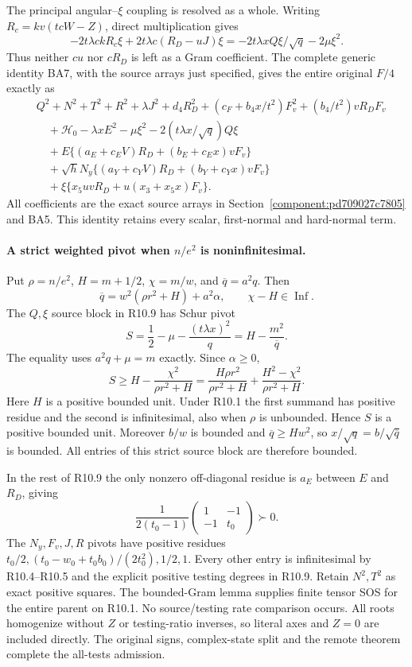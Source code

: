 The principal angular--$\xi$ coupling is resolved as a whole.
Writing $R_c=kv(tcW-Z)$, direct multiplication gives
\[
 -2t\lambda ck R_c\xi+2t\lambda c(R_D-uJ)\xi
 =-2t\lambda x Q\xi/\sqrt q-2\mu\xi^2.
\tag{R10.8}
\]
Thus neither $cu$ nor $cR_D$ is left as a Gram coefficient. The
complete generic identity BA7, with the source arrays just specified,
gives the entire original $F/4$ exactly as
\[
\begin{split}
 &Q^2+N^2+T^2+R^2+\lambda J^2+d_4R_D^2
 +(c_F+b_4x/t^2)F_v^2+(b_4/t^2)vR_DF_v\\
 &\quad+\mathcal H_0-\lambda xE^2-\mu\xi^2
                  -2(t\lambda x/\sqrt q)Q\xi\\
 &\quad+E\{(a_E+c_EV)R_D+(b_E+c_Ex)vF_v\}\\
 &\quad+\sqrt hN_y\{(a_Y+c_YV)R_D+(b_Y+c_Yx)vF_v\}\\
 &\quad+\xi\{x_5uvR_D+u(x_3+x_5x)F_v\}.
\end{split}
\tag{R10.9}
\]
All coefficients are the exact source arrays in
Section~\ref{component:pd709027c7805} and BA5.
This identity retains every scalar, first-normal and hard-normal term.

\paragraph{A strict weighted pivot when $n/e^2$ is noninfinitesimal.}
Put $\rho=n/e^2$, $H=m+1/2$, $\chi=m/w$, and
$\overline q=a^2q$. Then
\[
 \overline q=w^2(\rho r^2+H)+a^2\alpha,
 \qquad \chi-H\in\operatorname{Inf}.
\tag{R10.10}
\]
The $Q,\xi$ source block in R10.9 has Schur pivot
\[
 S=\frac12-\mu-\frac{(t\lambda x)^2}{q}
   =H-\frac{m^2}{\overline q}.
\tag{R10.11}
\]
The equality uses $a^2q+\mu=m$ exactly. Since $\alpha\ge0$,
\[
 S\ge H-\frac{\chi^2}{\rho r^2+H}
 =\frac{H\rho r^2}{\rho r^2+H}
    +\frac{H^2-\chi^2}{\rho r^2+H}.
\tag{R10.12}
\]
Here $H$ is a positive bounded unit. Under R10.1 the first summand
has positive residue and the second is infinitesimal, also when
$\rho$ is unbounded. Hence $S$ is a positive bounded unit.
Moreover $b/w$ is bounded and $\overline q\ge Hw^2$, so
$x/\sqrt q=b/\sqrt{\overline q}$ is bounded. All entries of this
strict source block are therefore bounded.

In the rest of R10.9 the only nonzero off-diagonal residue is
$a_E$ between $E$ and $R_D$, giving
\[
 \frac1{2(t_0-1)}
 \begin{pmatrix}1&-1\\-1&t_0\end{pmatrix}\succ0.
\]
The $N_y,F_v,J,R$ pivots have positive residues
$t_0/2,(t_0-w_0+t_0b_0)/(2t_0^2),1/2,1$.
Every other entry is infinitesimal by R10.4--R10.5 and the explicit
positive testing degrees in R10.9. Retain $N^2,T^2$ as exact positive
squares. The bounded-Gram lemma supplies finite tensor SOS for the
entire parent on R10.1. No source/testing rate comparison occurs.
All roots homogenize without $Z$ or testing-ratio inverses, so literal
axes and $Z=0$ are included directly. The original signs, complex-state
split and the remote theorem complete the all-tests admission.

